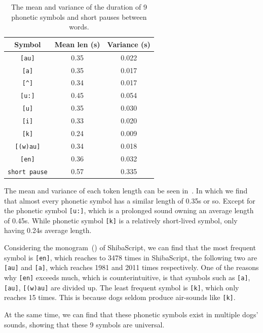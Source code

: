 \begin{table}[th]
\centering
\small
\begin{tabular}{c|c|c}
\hline
\textbf{Symbol} & \textbf{Mean len (s)} & \textbf{Variance (s)}\\
\hline
\verb|[au]| & 0.35 & 0.022 \\
\verb|[a]| & 0.35 & 0.017 \\
\verb|[^]| & 0.34 & 0.017\\
\verb|[u:]| & 0.45 & 0.054\\
\verb|[u]| & 0.35 & 0.030\\
\verb|[i]| & 0.33 & 0.020\\
\verb|[k]| &  0.24 & 0.009\\
\verb|[(w)au]| & 0.34 & 0.018\\
\verb|[en]| & 0.36 & 0.032\\
\verb|short pause| & 0.57 & 0.335\\
\hline
\end{tabular}
\caption{The mean and variance of the duration of 9 phonetic symbols 
and short pauses between words.}
\label{tab:tokenanalysis}
\end{table}

The mean and variance of each token length can be seen in~. In which we find that almost every phonetic symbol has a similar length of 0.35s or so. Except for the phonetic symbol \verb|[u:]|, which is a prolonged sound owning an average length of 0.45s. While phonetic symbol \verb|[k]| is a relatively short-lived symbol, only having 0.24s average length.

Considering the monogram~() of ShibaScript, we can find that the most frequent symbol is \verb|[en]|, which reaches to 3478 times in ShibaScript, the following two are \verb|[au]| and \verb|[a]|, which reaches  1981 and 2011 times respectively. One of the reasons why \verb|[en]| exceeds much, which is counterintuitive, is that symbols such as \verb|[a]|, \verb|[au]|, \verb|[(w)au]| are divided up. The least frequent symbol is \verb|[k]|, which only reaches 15 times. This is because dogs seldom produce air-sounds like \verb|[k]|.

At the same time, we can find that these phonetic symbols exist in multiple dogs' sounds, showing that these 9 symbols are universal.

